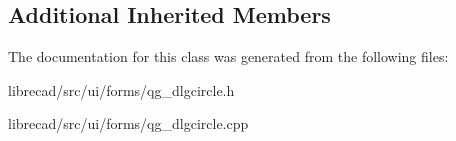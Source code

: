 \subsection*{Additional Inherited Members}


The documentation for this class was generated from the following files\-:\begin{DoxyCompactItemize}
\item 
librecad/src/ui/forms/qg\-\_\-dlgcircle.\-h\item 
librecad/src/ui/forms/qg\-\_\-dlgcircle.\-cpp\end{DoxyCompactItemize}
